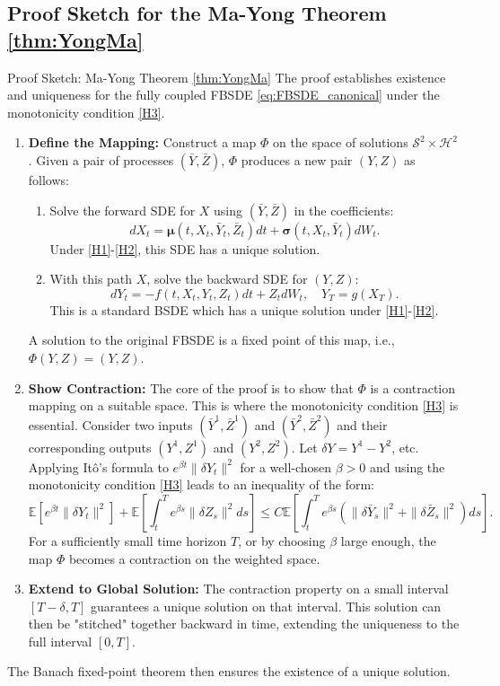 \documentclass[11pt,letterpaper,oneside]{article}
\theoremstyle{plain}
\theoremstyle{definition}
\theoremstyle{remark}
\begin{document}
\subsection{Proof Sketch for the Ma-Yong Theorem \ref{thm:YongMa}}
\label{app:YongMaProof_appendix}
\begin{leanproofbox}{Proof Sketch: Ma-Yong Theorem \ref{thm:YongMa}}
The proof establishes existence and uniqueness for the fully coupled FBSDE \eqref{eq:FBSDE_canonical} under the monotonicity condition \ref{H3}.

\begin{enumerate}
    \item \textbf{Define the Mapping:} Construct a map \(\Phi\) on the space of solutions \(\mathcal{S}^2 \times \mathcal{H}^2\). Given a pair of processes \((\bar{Y}, \bar{Z})\), \(\Phi\) produces a new pair \((Y,Z)\) as follows:
    \begin{enumerate}
        \item Solve the forward SDE for \(X\) using \((\bar{Y}, \bar{Z})\) in the coefficients:
        \[ dX_t = \bm\mu(t, X_t, \bar{Y}_t, \bar{Z}_t)dt + \bm\sigma(t, X_t, \bar{Y}_t)dW_t. \]
        Under \ref{H1}-\ref{H2}, this SDE has a unique solution.
        \item With this path \(X\), solve the backward SDE for \((Y,Z)\):
        \[ dY_t = -f(t, X_t, Y_t, Z_t)dt + Z_t dW_t, \quad Y_T = g(X_T). \]
        This is a standard BSDE which has a unique solution under \ref{H1}-\ref{H2}.
    \end{enumerate}
    A solution to the original FBSDE is a fixed point of this map, i.e., \(\Phi(Y,Z) = (Y,Z)\).

    \item \textbf{Show Contraction:} The core of the proof is to show that \(\Phi\) is a contraction mapping on a suitable space. This is where the monotonicity condition \ref{H3} is essential. Consider two inputs \((\bar{Y}^1, \bar{Z}^1)\) and \((\bar{Y}^2, \bar{Z}^2)\) and their corresponding outputs \((Y^1, Z^1)\) and \((Y^2, Z^2)\). Let \(\delta Y = Y^1 - Y^2\), etc. Applying Itô's formula to \(e^{\beta t}\|\delta Y_t\|^2\) for a well-chosen \(\beta > 0\) and using the monotonicity condition \ref{H3} leads to an inequality of the form:
    \[ \mathbb{E}[e^{\beta t}\|\delta Y_t\|^2] + \mathbb{E}\left[\int_t^T e^{\beta s}\|\delta Z_s\|^2 ds\right] \le C \mathbb{E}\left[\int_t^T e^{\beta s} (\|\delta \bar{Y}_s\|^2 + \|\delta \bar{Z}_s\|^2) ds\right]. \]
    For a sufficiently small time horizon \(T\), or by choosing \(\beta\) large enough, the map \(\Phi\) becomes a contraction on the weighted space.

    \item \textbf{Extend to Global Solution:} The contraction property on a small interval \([T-\delta, T]\) guarantees a unique solution on that interval. This solution can then be "stitched" together backward in time, extending the uniqueness to the full interval \([0,T]\).
\end{enumerate}
The Banach fixed-point theorem then ensures the existence of a unique solution.
\end{leanproofbox}
\end{document}
